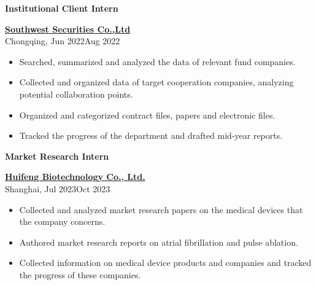 \documentclass[a4paper,20pt]{article}
\begin{document}
\begin{minipage}{.4\linewidth} \begin{flushleft}
    		\textbf{Institutional Client Intern}
    	\end{flushleft} \end{minipage}
    \hfill
    \begin{minipage}{.5\linewidth}\begin{flushright}
    	\href{https://www.swsc.hk/en/site/index}{\textbf{Southwest Securities Co.,Ltd}}\\ Chongqing, Jun 2022\textemdash Aug 2022
    \end{flushright}\end{minipage}
    \begin{itemize}
    \centering
    \justifying
	\item{Searched, summarized and analyzed the data of relevant fund companies.}
    \vspace{-5pt}
   	\item{Collected and organized data of target cooperation companies, analyzing potential collaboration points.}
    \vspace{-5pt}
    \item{Organized and categorized contract files, papers and electronic files.}
    \vspace{-5pt}
    \item{Tracked the progress of the department and drafted mid-year reports.}
    \end{itemize}
 

\begin{minipage}{.4\linewidth} \begin{flushleft}
\textbf{Market Research Intern}
    	\end{flushleft} \end{minipage}
    \hfill
    \begin{minipage}{.5\linewidth}\begin{flushright}
\href{www.cryofocus.com}{\textbf{Huifeng Biotechnology Co., Ltd.}} \\	 
Shanghai, Jul 2023\textemdash Oct 2023
    	\end{flushright}\end{minipage}
    
    \begin{itemize}
    \centering
    \justifying
    \item Collected and analyzed market research papers on the medical devices that the company concerns. 
    \vspace{-5pt}
    \item Authored market research reports on atrial fibrillation and pulse ablation.            \vspace{-5pt}
    \item Collected information on medical device products and companies and tracked the progress of these companies.
    \end{itemize}
\end{document}
